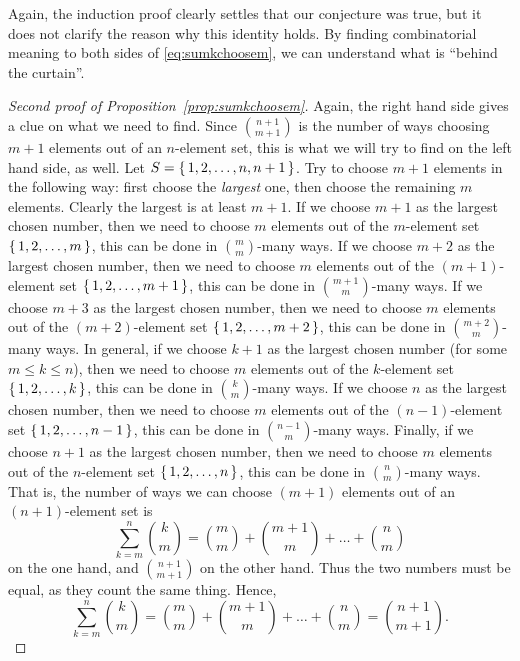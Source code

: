 Again, 
the induction proof clearly settles that our conjecture was true, 
but it does not clarify the reason why this identity holds. 
By finding combinatorial meaning to both sides of \eqref{eq:sumkchoosem}, 
we can understand what is ``behind the curtain''. 

\begin{proof}[Second proof of Proposition~\ref{prop:sumkchoosem}]
Again, the right hand side gives a clue on what we need to find. 
Since $\binom{n+1}{m+1}$ is the number of ways choosing $m+1$ elements out of an $n$-element set, 
this is what we will try to find on the left hand side, as well. 
Let $S= \left\{\,1, 2, \dots , n, n+1\,\right\}$. 
Try to choose $m+1$ elements in the following way: first choose the \emph{largest} one, 
then choose the remaining $m$ elements. 
Clearly the largest is at least $m+1$. 
If we choose $m+1$ as the largest chosen number, 
then we need to choose $m$ elements out of the $m$-element set $\left\{\,1, 2, \dots , m\,\right\}$, 
this can be done in $\binom{m}{m}$-many ways. 
If we choose $m+2$ as the largest chosen number, 
then we need to choose $m$ elements out of the $(m+1)$-element set $\left\{\,1, 2, \dots , m+1\,\right\}$, 
this can be done in $\binom{m+1}{m}$-many ways. 
If we choose $m+3$ as the largest chosen number, 
then we need to choose $m$ elements out of the $(m+2)$-element set $\left\{\,1, 2, \dots , m+2\,\right\}$, 
this can be done in $\binom{m+2}{m}$-many ways. 
In general, if we choose $k+1$ as the largest chosen number (for some $m \leq k\leq n$), 
then we need to choose $m$ elements out of the $k$-element set $\left\{\,1, 2, \dots , k\,\right\}$, 
this can be done in $\binom{k}{m}$-many ways. 
If we choose $n$ as the largest chosen number, 
then we need to choose $m$ elements out of the $(n-1)$-element set $\left\{\,1, 2, \dots , n-1\,\right\}$, 
this can be done in $\binom{n-1}{m}$-many ways. 
Finally, if we choose $n+1$ as the largest chosen number, 
then we need to choose $m$ elements out of the $n$-element set $\left\{\,1, 2, \dots , n\,\right\}$, 
this can be done in $\binom{n}{m}$-many ways. 
That is, the number of ways we can choose $(m+1)$ elements out of an $(n+1)$-element set is 
\[
\sum_{k=m}^n \binom{k}{m} = \binom{m}{m} + \binom{m+1}{m} + \dots + \binom{n}{m}
\]
on the one hand, and $\binom{n+1}{m+1}$ on the other hand. 
Thus the two numbers must be equal, as they count the same thing. 
Hence, 
\[
\sum_{k=m}^n \binom{k}{m} = \binom{m}{m} + \binom{m+1}{m} + \dots + \binom{n}{m} = \binom{n+1}{m+1}. 
\]
\end{proof}

